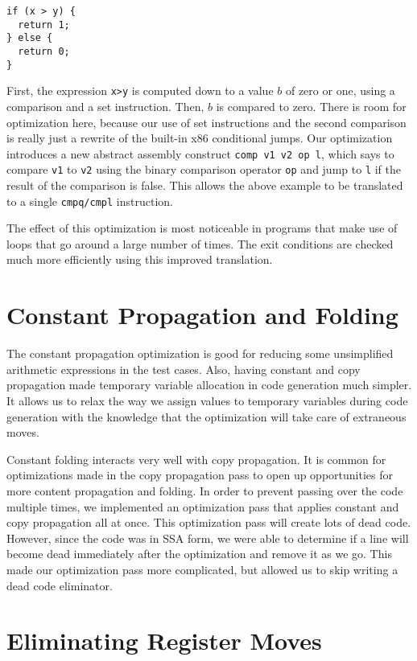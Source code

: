\documentclass[aps,letterpaper,11pt]{revtex4}
\begin{document}
\begin{verbatim}
if (x > y) {
  return 1;
} else {
  return 0;
}
\end{verbatim}

First, the expression \texttt{x>y} is computed down to a value $b$ of zero or one, using a comparison and a set
instruction. Then, $b$ is compared to zero. There is room for optimization here, because our use of set 
instructions and the second comparison is really just a rewrite of the built-in x86 conditional jumps. Our
optimization introduces a new abstract assembly construct \texttt{comp v1 v2 op l}, which says to compare
\texttt{v1} to \texttt{v2} using the binary comparison operator \texttt{op} and jump to \texttt{l} if the result
of the comparison is false. This allows the above example to be translated to a single \texttt{cmpq/cmpl} 
instruction.

The effect of this optimization is most noticeable in programs that make use of loops that go around a
large number of times. The exit conditions are checked much more efficiently using this improved translation.

 
\section{Constant Propagation and Folding}

The constant propagation optimization is good for reducing some unsimplified arithmetic expressions in the
test cases. Also, having constant and copy propagation made temporary variable allocation in code generation
much simpler. It allows us to relax the way we assign values to temporary variables during code generation 
with the knowledge that the optimization will take care of extraneous moves.

Constant folding interacts very well with copy propagation. It is common for optimizations made in the 
copy propagation pass to open up opportunities for more content propagation and folding. In order to prevent 
passing over the code multiple times, we implemented an optimization pass that applies constant and copy
propagation all at once. This optimization pass will create lots of dead code. However, since the code was
in SSA form, we were able to determine if a line will become dead immediately after the optimization and
remove it as we go. This made our optimization pass more complicated, but allowed us to skip writing
a dead code eliminator.

\section{Eliminating Register Moves}
\end{document}
